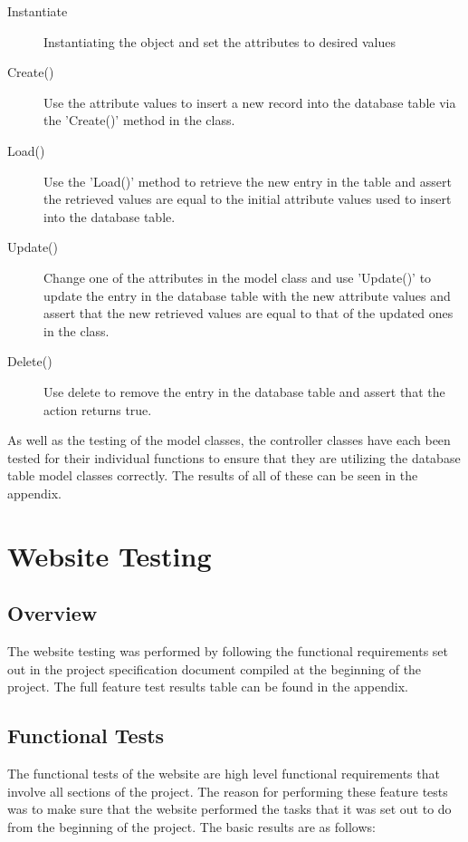 \begin{description}
\item[Instantiate] Instantiating the object and set the attributes to desired values
\item[Create()] Use the attribute values to insert a new record into the database table via the 'Create()' method in the class.
\item[Load()] Use the 'Load()' method to retrieve the new entry in the table and assert the retrieved values are equal to the initial attribute values used to insert into the database table.
\item[Update()] Change one of the attributes in the model class and use 'Update()' to update the entry in the database table with the new attribute values and assert that the new retrieved values are equal to that of the updated ones in the class.
\item[Delete()] Use delete to remove the entry in the database table and assert that the action returns true.
\end{description}

As well as the testing of the model classes, the controller classes have each been tested for their individual functions to ensure that they are utilizing the database table model classes correctly. The results of all of these can be seen in the appendix.

\section{Website Testing}
	\subsection{Overview}
		The website testing was performed by following the functional requirements set out in the project specification document compiled at the beginning of the project. The full feature test results table can be found in the appendix.
	\subsection{Functional Tests}
		The functional tests of the website are high level functional requirements that involve all sections of the project. The reason for performing these feature tests was to make sure that the website performed the tasks that it was set out to do from the beginning of the project. The basic results are as follows:


